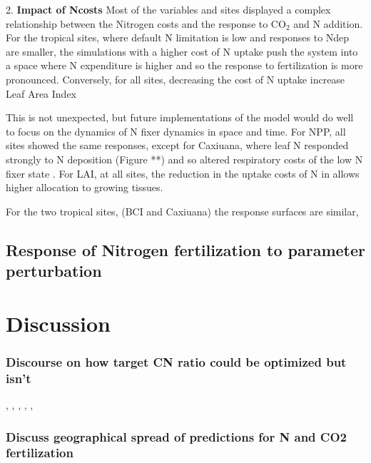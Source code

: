 \documentclass[draft,linenumbers]{agujournal}
\begin{document}
2. \textbf{Impact of Ncosts}
Most of the variables and sites displayed a complex relationship between the Nitrogen costs and the response to CO$_{2}$ and N addition. 
For the tropical sites, where default N limitation is low and responses to Ndep are smaller, the simulations with a higher cost of N uptake push the system into a space where N expenditure is higher and so the response to fertilization is more pronounced. Conversely, for all sites, decreasing the cost of N uptake increase Leaf Area Index 






This is not unexpected, but future implementations of the model would do well to focus on the dynamics of N fixer dynamics in space and time. For NPP, all sites showed the same responses, except for Caxiuana, where leaf N responded strongly to N deposition (Figure **) and so altered respiratory costs of the low N fixer state . For LAI, at all sites, the reduction in the uptake costs of N in  allows higher allocation to growing tissues. 



For the two tropical sites, (BCI and Caxiuana) the response surfaces are similar,

\subsection{Response of Nitrogen fertilization to parameter perturbation}


\section{Discussion}

\subsubsection{Discourse on how target CN ratio could be optimized but isn't}
\cite{thomas2014}, \cite{friedlingstein1999}, \cite{franklin2012}, \cite{mcmurtrie2013}, \cite{anten2011}, \cite{vanwijk2003}

\subsubsection{Discuss geographical spread of predictions for N and CO2 fertilization}
\cite{hickler2008}
\end{document}

